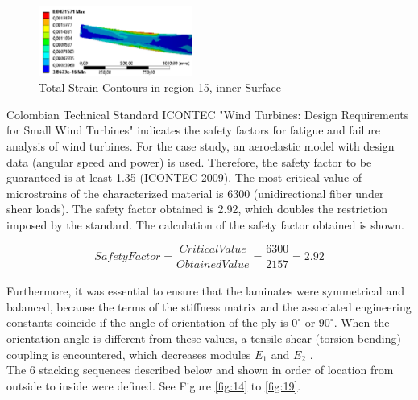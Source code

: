 \begin{figure}[H]
  \includegraphics[width=0.45\textwidth]{p6}
\caption{Total Strain Contours in region 15, inner Surface  }
\label{fig:13}       %
\end{figure}

Colombian Technical Standard ICONTEC "Wind Turbines: Design Requirements for Small Wind Turbines" indicates the safety factors for fatigue and failure analysis of wind turbines. For the case study, an aeroelastic model with design data (angular speed and power) is used. Therefore, the safety factor to be guaranteed is at least 1.35 (ICONTEC 2009). The most critical value of microstrains of the characterized material is 6300 (unidirectional fiber under shear loads). The safety factor obtained is 2.92, which doubles the restriction imposed by the standard. The calculation of the safety factor obtained is shown.

\begin{equation}
Safety Factor= \frac{Critical Value}{Obtained Value} = \frac{6300}{2157} = 2.92%
\end{equation}\\

Furthermore, it was essential to ensure that the laminates were symmetrical and balanced, because the terms of the stiffness matrix and the associated engineering constants coincide if the angle of orientation of the ply is $0^\circ$ or $90^\circ$. When the orientation angle is different from these values, a tensile-shear (torsion-bending) coupling is encountered, which decreases modules $E_1$ and $E_2$ \cite{miravete2}.\\

The 6 stacking sequences described below and shown in order of location from outside to inside were defined. See Figure \ref{fig:14} to \ref{fig:19}. 

